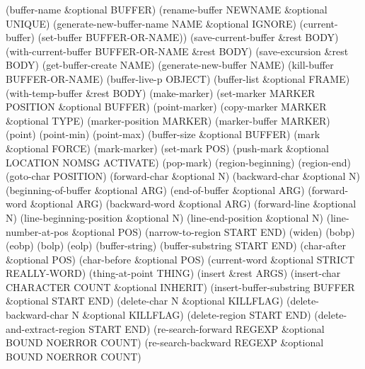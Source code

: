 \documentclass[11pt]{ctexart}
\begin{document}
{{{{(buffer-name \&optional BUFFER)
(rename-buffer NEWNAME \&optional UNIQUE)
(generate-new-buffer-name NAME \&optional IGNORE)
(current-buffer)
(set-buffer BUFFER-OR-NAME))
(save-current-buffer \&rest BODY)
(with-current-buffer BUFFER-OR-NAME \&rest BODY)
(save-excursion \&rest BODY)
(get-buffer-create NAME)
(generate-new-buffer NAME)
(kill-buffer BUFFER-OR-NAME)
(buffer-live-p OBJECT)
(buffer-list \&optional FRAME)
(with-temp-buffer \&rest BODY)
(make-marker)
(set-marker MARKER POSITION \&optional BUFFER)
(point-marker)
(copy-marker MARKER \&optional TYPE)
(marker-position MARKER)
(marker-buffer MARKER)
(point)
(point-min)
(point-max)
(buffer-size \&optional BUFFER)
(mark \&optional FORCE)
(mark-marker)
(set-mark POS)
(push-mark \&optional LOCATION NOMSG ACTIVATE)
(pop-mark)
(region-beginning)
(region-end)
(goto-char POSITION)
(forward-char \&optional N)
(backward-char \&optional N)
(beginning-of-buffer \&optional ARG)
(end-of-buffer \&optional ARG)
(forward-word \&optional ARG)
(backward-word \&optional ARG)
(forward-line \&optional N)
(line-beginning-position \&optional N)
(line-end-position \&optional N)
(line-number-at-pos \&optional POS)
(narrow-to-region START END)
(widen)
(bobp)
(eobp)
(bolp)
(eolp)
(buffer-string)
(buffer-substring START END)
(char-after \&optional POS)
(char-before \&optional POS)
(current-word \&optional STRICT REALLY-WORD)
(thing-at-point THING)
(insert \&rest ARGS)
(insert-char CHARACTER COUNT \&optional INHERIT)
(insert-buffer-substring BUFFER \&optional START END)
(delete-char N \&optional KILLFLAG)
(delete-backward-char N \&optional KILLFLAG)
(delete-region START END)
(delete-and-extract-region START END)
(re-search-forward REGEXP \&optional BOUND NOERROR COUNT)
(re-search-backward REGEXP \&optional BOUND NOERROR COUNT)
}}}}
\end{document}
